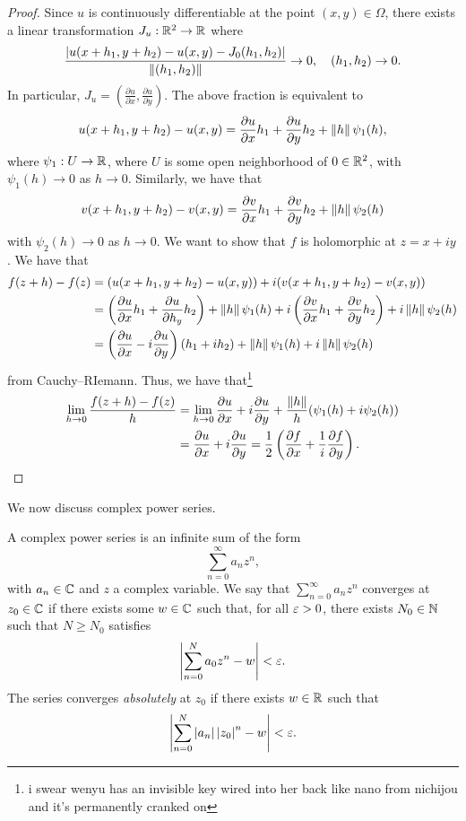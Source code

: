 \begin{proof}
    Since $u$ is continuously differentiable at the point $(x, y) \in \Omega$, there exists a linear transformation $J_u : \mathbb R^2 \to \mathbb R$ where
    \[ \frac{\left\lvert u(x+h_1, y+h_2) - u(x, y) - J_0(h_1, h_2) \right\rvert}{\left\lVert (h_1, h_2) \right\rVert}  \to 0, \quad (h_1, h_2) \to 0. \]
    In particular, $J_u = (\frac{\partial u}{\partial x}, \frac{\partial u}{\partial y})$. The above fraction is equivalent to
    \[ u(x + h_1, y + h_2) - u(x, y) = \frac{\partial u}{\partial x} h_1 + \frac{\partial u}{\partial y} h_2 + \left\lVert h \right\rVert \psi_1(h), \]
    where $\psi_1 : U \to \mathbb R$, where $U$ is some open neighborhood of $0 \in \mathbb R^2$, with $\psi_1(h) \to 0$ as $h \to 0$. Similarly, we have that
    \[ v(x + h_1, y + h_2) - v(x, y) = \frac{\partial v}{\partial x} h_1 + \frac{\partial v}{\partial y} h_2 + \left\lVert h \right\rVert \psi_2(h) \]
    with $\psi_2(h) \to 0$ as $h \to 0$. We want to show that $f$ is holomorphic at $z = x + iy$. We have that
    \begin{align*}
        f(z + h) - f(z) &= (u(x + h_1, y + h_2) - u(x, y)) + i(v(x + h_1, y + h_2) - v(x, y)) \\
        &= \left(\frac{\partial u}{\partial x} h_1 + \frac{\partial u}{\partial h_y} h_2\right) + \left\lVert h \right\rVert \psi_1(h) + i\left(\frac{\partial v}{\partial x} h_1 + \frac{\partial v}{\partial y} h_2\right) + i \left\lVert h \right\rVert \psi_2(h) \\
        &= \left(\frac{\partial u}{\partial x} - i \frac{\partial u}{\partial y}\right) (h_1 + ih_2) + \left\lVert h \right\rVert \psi_1(h) + i \left\lVert h \right\rVert \psi_2(h)
    \end{align*}
    from Cauchy--RIemann. Thus, we have that\footnote{i swear wenyu has an invisible key wired into her back like nano from nichijou and it's permanently cranked on}
    \begin{align*}
        \lim_{h \to 0} \frac{f(z+h) - f(z)}{h} &= \lim_{h \to 0} \frac{\partial u}{\partial x} + i \frac{\partial u}{\partial y} + \frac{\left\lVert h \right\rVert}{h} (\psi_1(h) + i \psi_2(h)) \\
        &= \frac{\partial u}{\partial x} + i \frac{\partial u}{\partial y} = \frac{1}{2} \left(\frac{\partial f}{\partial x} + \frac{1}{i} \frac{\partial f}{\partial y}\right). \qedhere
    \end{align*}
\end{proof}
\noindent We now discuss complex power series.
\begin{definition}
    A complex power series is an infinite sum of the form
    \[ \sum_{n=0}^\infty a_n z^n, \]
    with $a_n \in \mathbb C$ and $z$ a complex variable. We say that $\sum_{n=0}^\infty a_n z^n$ converges at $z_0 \in \mathbb C$ if there exists some $w \in \mathbb C$ such that, for all $\varepsilon > 0$, there exists $N_0 \in \mathbb N$ such that $N \geq N_0$ satisfies
    \[ \left\lvert \sum_{n=0}^N a_0 z^n - w \right\rvert < \varepsilon. \]
    The series converges \textit{absolutely} at $z_0$ if there exists $w \in \mathbb R$ such that
    \[ \left\lvert \sum_{n=0}^N \left\lvert a_n \right\rvert \left\lvert z_0 \right\rvert^n - w \right\rvert < \varepsilon. \]
\end{definition}
